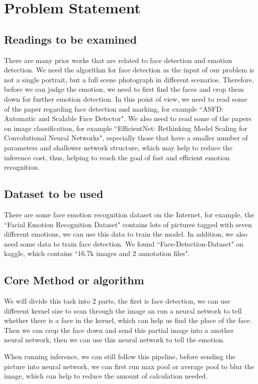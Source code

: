 \section{Problem Statement}
\subsection{Readings to be examined}
There are many prior works that are related to face detection and emotion detection. We need the algorithm for face detection as the input of our problem is not a single portrait, but a full scene photograph in different scenarios. Therefore, before we can judge the emotion, we need to first find the faces and crop them down for further emotion detection. In this point of view, we need to read some of the paper regarding face detection and marking, for example ``ASFD: Automatic and Scalable Face Detector"\cite{ASFD}. We also need to read some of the papers on image classification, for example ``EfficientNet: Rethinking Model Scaling for Convolutional Neural Networks"\cite{EfficientNet}, especially those that have a smaller number of parameters and shallower network structure, which may help to reduce the inference cost, thus, helping to reach the goal of fast and efficient emotion recognition.

\subsection{Dataset to be used}
There are some face emotion recognition dataset on the Internet, for example, the ``Facial Emotion Recognition Dataset" contains lots of pictures tagged with seven different emotions, we can use this data to train the model. In addition, we also need some data to train face detection. We found ``Face-Detection-Dataset" on kaggle, which contains ``16.7k images and 2 annotation files". 

\subsection{Core Method or algorithm}
We will divide this task into 2 parts, the first is face detection, we can use different kernel size to scan through the image an run a neural network to tell whether there is a face in the kernel, which can help us find the place of the face. Then we can crop the face down and send this partial image into a another neural network, then we can  use this neural network to tell the emotion.

When running inference, we can still follow this pipeline, before sending the picture into neural network, we can first run max pool or average pool to blur the image, which can help to reduce the amount of calculation needed.

